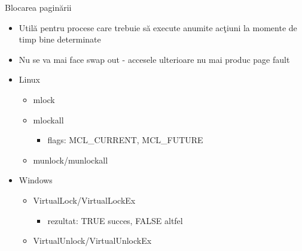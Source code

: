 \documentclass{so.cs.pub.ro}
\begin{document}
\begin{frame}{Blocarea paginării}
\begin{itemize}
  \item Utilă pentru procese care trebuie să execute anumite acţiuni la momente de timp bine determinate
  \vspace{0.2cm}
  \item Nu se va mai face swap out - accesele ulterioare nu mai produc page fault
  \vspace{0.5cm}
  \item Linux
  \begin{itemize}
    \item mlock
    \item mlockall
    \begin{itemize}
      \item flags: MCL_CURRENT, MCL_FUTURE
    \end{itemize}
    \item munlock/munlockall
  \end{itemize}
  \vspace{0.5cm}
  \item Windows
  \begin{itemize}
    \item VirtualLock/VirtualLockEx
    \begin{itemize}
      \item rezultat: TRUE succes, FALSE altfel
    \end{itemize}
    \item VirtualUnlock/VirtualUnlockEx
  \end{itemize}
\end{itemize}
\end{frame}

\end{document}
